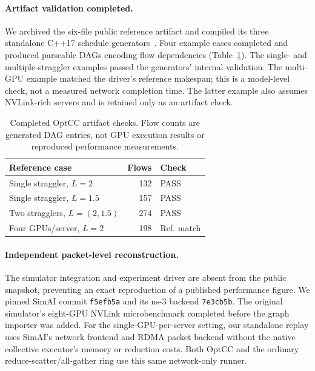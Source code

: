 \documentclass[sigconf]{acmart}
\begin{document}
\paragraph{Artifact validation completed.}
We archived the six-file public reference artifact and compiled its three
standalone C++17 schedule generators~\cite{optccArtifact2026}. Four example
cases completed and produced parseable DAGs encoding flow dependencies
(Table~\ref{tab:optcc-artifact}). The single- and multiple-straggler
examples passed the generators' internal validation. The multi-GPU example
matched the driver's reference makespan; this is a model-level check,
not a measured network completion time. The latter example also assumes
NVLink-rich servers and is retained only as an artifact check.

\begin{table}[t]
  \caption{Completed OptCC artifact checks. Flow counts are generated DAG
  entries, not GPU execution results or reproduced performance measurements.}
  \label{tab:optcc-artifact}
  \centering
  \small
  \begin{tabular}{@{}lrl@{}}
    \toprule
    Reference case & Flows & Check \\
    \midrule
    Single straggler, $L=2$ & 132 & PASS \\
    Single straggler, $L=1.5$ & 157 & PASS \\
    Two stragglers, $L=(2,1.5)$ & 274 & PASS \\
    Four GPUs/server, $L=2$ & 198 & Ref. match \\
    \bottomrule
  \end{tabular}
\end{table}

\paragraph{Independent packet-level reconstruction.}
The simulator integration and experiment driver are absent from the
public snapshot, preventing an exact reproduction of a published
performance figure. We pinned SimAI commit \texttt{f5efb5a} and
its ns-3 backend \texttt{7e3cb5b}. The original simulator's eight-GPU
NVLink microbenchmark completed before the graph importer was added.
For the single-GPU-per-server setting, our standalone replay uses SimAI's
network frontend and RDMA packet backend without the native collective
executor's memory or reduction costs. Both OptCC and the ordinary
reduce-scatter/all-gather ring use this same network-only runner.
\end{document}
